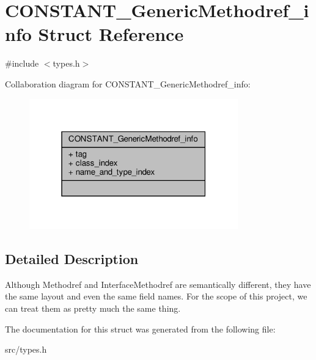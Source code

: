 \hypertarget{structCONSTANT__GenericMethodref__info}{}\section{C\+O\+N\+S\+T\+A\+N\+T\+\_\+\+Generic\+Methodref\+\_\+info Struct Reference}
\label{structCONSTANT__GenericMethodref__info}


{\ttfamily \#include $<$types.\+h$>$}



Collaboration diagram for C\+O\+N\+S\+T\+A\+N\+T\+\_\+\+Generic\+Methodref\+\_\+info\+:
\nopagebreak
\begin{figure}[H]
\begin{center}
\leavevmode
\includegraphics[width=256pt]{structCONSTANT__GenericMethodref__info__coll__graph}
\end{center}
\end{figure}


\subsection{Detailed Description}
Although Methodref and Interface\+Methodref are semantically different, they have the same layout and even the same field names. For the scope of this project, we can treat them as pretty much the same thing. 

The documentation for this struct was generated from the following file\+:\begin{DoxyCompactItemize}
\item 
src/types.\+h\end{DoxyCompactItemize}
